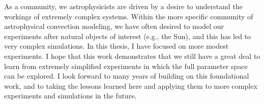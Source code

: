As a community, we astrophysicists are driven by a desire to understand the workings of extremely complex systems.
Within the more specific community of astrophysical convection modeling, we have often desired to model our experiments after natural objects of interest (e.g., the Sun), and this has led to very complex simulations.
In this thesis, I have focused on more modest experiments.
I hope that this work demonstrates that we still have a great deal to learn from extremely simplified experiments in which the full parameter space can be explored.
I look forward to many years of building on this foundational work, and to taking the lessons learned here and applying them to more complex experiments and simulations in the future.
